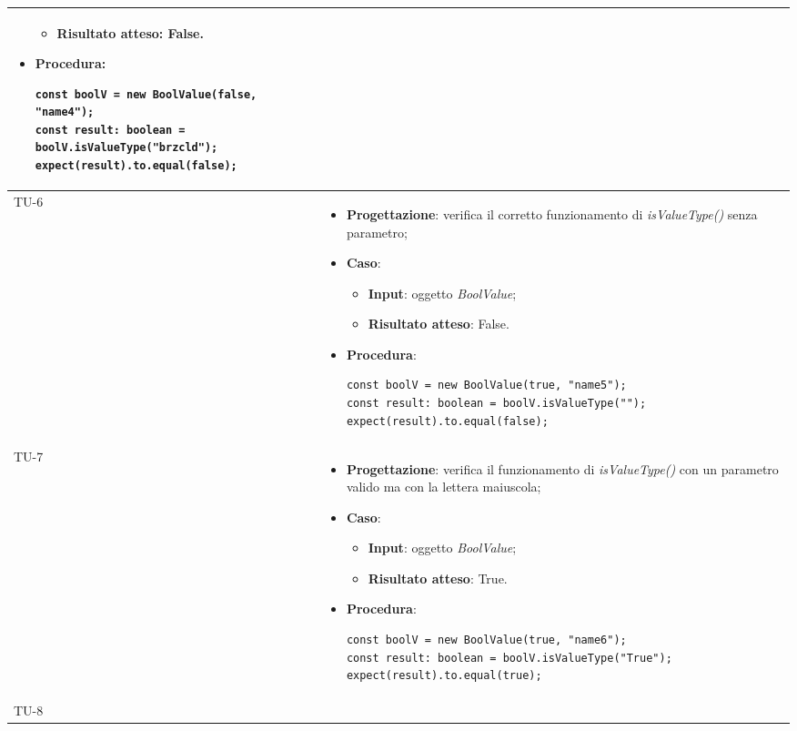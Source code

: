\begin{longtable}{|C{1.5cm}|C{14.5cm}|}
\begin{itemize}
\begin{itemize}
			\item \textbf{Risultato atteso}: False.
		\end{itemize}
		\item \textbf{Procedura}:
		\begin{lstlisting}
const boolV = new BoolValue(false, "name4");
const result: boolean = boolV.isValueType("brzcld");
expect(result).to.equal(false);		
		\end{lstlisting}
	\end{itemize}\\
	\hline
	{TU-6} &  
	\begin{itemize}
		\item \textbf{Progettazione}: verifica il corretto funzionamento di \emph{isValueType()} senza parametro;
		\item \textbf{Caso}: 
		\begin{itemize}
			\item \textbf{Input}: oggetto \emph{BoolValue};
			\item \textbf{Risultato atteso}: False.
		\end{itemize}
		\item \textbf{Procedura}:
		\begin{lstlisting}
const boolV = new BoolValue(true, "name5");
const result: boolean = boolV.isValueType("");
expect(result).to.equal(false);		
		\end{lstlisting}
	\end{itemize}\\
	\hline
	{TU-7} &  
	\begin{itemize}
		\item \textbf{Progettazione}: verifica il funzionamento di \emph{isValueType()} con un parametro valido ma con la lettera maiuscola;
		\item \textbf{Caso}: 
		\begin{itemize}
			\item \textbf{Input}: oggetto \emph{BoolValue};
			\item \textbf{Risultato atteso}: True.
		\end{itemize}
		\item \textbf{Procedura}:
		\begin{lstlisting}
const boolV = new BoolValue(true, "name6");
const result: boolean = boolV.isValueType("True");
expect(result).to.equal(true);		
		\end{lstlisting}
	\end{itemize}\\
	\hline
	{TU-8} &  
	\begin{itemize}

\end{itemize}
\end{longtable}
